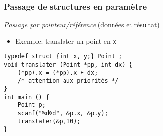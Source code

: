 \documentclass[table,handout,tikz,12pt,svgnames]{beamer}
\begin{document}
\begin{frame}[fragile=singleslide]
	\frametitle{Passage de structures en paramètre}
	\vspace{-0.7cm}
	\begin{itemize}
	\vspace{.3cm}	
	\end{itemize}
				\begin{verbatim}
typedef struct {int x, y;} Point ;
void translater (Point *pp, int dx) {
	(*pp).x = (*pp).x + dx; 
	/* attention aux priorités */
}
int main () {
	Point p;
	scanf("%d%d", &p.x, &p.y);
	translater(&p,10);
}
				\end{verbatim}
\end{frame}
\end{document}
